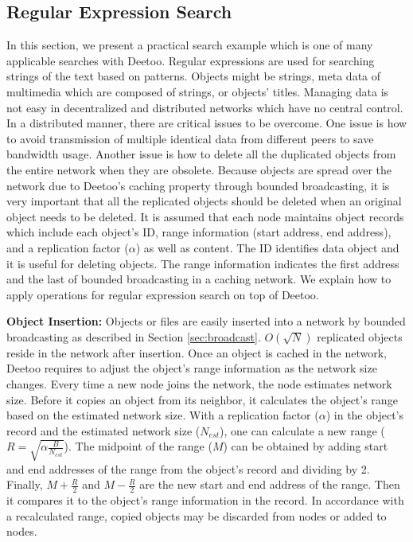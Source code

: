 \subsection{Regular Expression Search}\label{sec:regex}
In this section, we present a practical search example which is one of many 
applicable searches with Deetoo.   
Regular expressions are used for searching strings of the text based on patterns. 
Objects might be strings, meta data of multimedia which are composed of strings, or 
objects' titles.
Managing data is not easy in decentralized and distributed 
networks which have no central control. In a distributed manner, there are critical issues 
to be overcome.
One issue is how to avoid transmission of multiple identical data 
from different peers to save bandwidth usage. 
Another issue is how to delete all the duplicated objects from the entire 
network when they are obsolete. 
Because objects are spread over the network due to Deetoo's caching property through  
bounded broadcasting, it is very important that all the replicated objects  
should be deleted when an original object needs to be deleted. 
It is assumed that each node maintains object records which include each object's ID, 
range information (start address, end address), and a replication factor ($\alpha$) as well as content.
The ID identifies data object and it is useful for deleting objects. 
The range information indicates the first address and the last 
of bounded broadcasting in a caching network. 
We explain how to apply operations for regular expression search on top of Deetoo.

\textbf{Object Insertion:} Objects or files are easily inserted into a network by 
bounded broadcasting as described in Section \ref{sec:broadcast}. $O(\sqrt{N})$ replicated objects 
reside in the network after insertion. 
Once an object is cached in the network, Deetoo requires to adjust the object's range information 
as the network size changes. Every time a new node joins the network, the node estimates network size. 
Before it copies an object from its neighbor, it calculates the object's range based on the 
estimated network size. With a replication factor ($\alpha$) in the object's record and the 
estimated network size ($N_{est}$), one can calculate a new range ($R=\sqrt{\alpha \frac{B}{N_{est}}}$).
The midpoint of the range ($M$) can be obtained by adding start and end addresses of the 
range from the object's record
and dividing by 2. Finally, $M+\frac{R}{2}$ and $M-\frac{R}{2}$ are the new start and end address 
of the range.
Then it compares it to the object's 
range information in the record. In accordance with a recalculated range, copied objects may be discarded 
from nodes or added to nodes.

